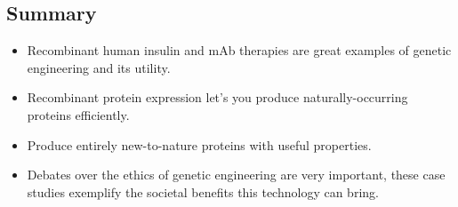 \subsection{Summary}
\begin{itemize}
    \item Recombinant human insulin and mAb therapies are great examples of genetic engineering and its utility.
    \item Recombinant protein expression let’s you produce naturally-occurring proteins efficiently.
    \item Produce entirely new-to-nature proteins with useful properties.
    \item Debates over the ethics of genetic engineering are very important, these case studies exemplify the societal benefits this technology can bring.
\end{itemize}

